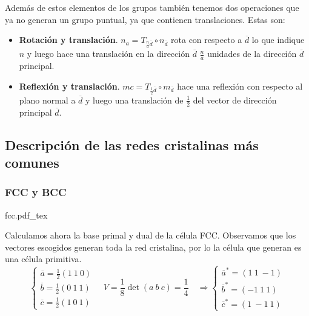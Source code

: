 \documentclass[leqno]{article}
\newcommand{\incfig}[1]{%
\center
\def\svgwidth{0.9\columnwidth}
{#1.pdf_tex}
}
\begin{document}
Además de estos elementos de los grupos también tenemos dos operaciones que ya no generan un grupo puntual, ya que contienen translaciones. Estas son:
\begin{itemize}[topsep=-6pt, itemsep=0pt]
  \item \textbf{Rotación y translación}. $n_a = T_{\frac{n}{a}\overline{d}}\circ n_{\overline{d}}$ rota con respecto a $\overline{d}$ lo que indique $n$  y luego hace una translación en la dirección  $\overline{d}$ $\frac{n}{a}$ unidades de la dirección $\overline{d}$ principal.
  \item  \textbf{Reflexión y translación}. $mc= T_{\frac{1}{2}\overline{d}}\circ m_{\overline{d}}$ hace una reflexión con respecto al plano normal a $\overline{d}$ y luego una translación de $\frac{1}{2}$ del vector de dirección principal $\overline{d}$.
\end{itemize}

\subsection{Descripción de las redes cristalinas más comunes}
\subsubsection{FCC y BCC}
\begin{minipage}{0.9\textwidth}
\incfig{fcc}
\end{minipage}

Calculamos ahora la base primal y dual de la célula FCC. Observamos que los vectores escogidos generan toda la red cristalina, por lo la célula que generan es una célula primitiva.
\[
\begin{cases}
  \overline{a} = \frac{1}{2} (1\ 1\ 0) \\
  \overline{b} = \frac{1}{2} (0\ 1\ 1) \\
  \overline{c} = \frac{1}{2} (1\ 0\ 1)
\end{cases} \quad 
V = \frac{1}{8}\det(a\ b\ c) = \frac{1}{4} \quad \Rightarrow
\begin{cases}
  \overline{a}^* = (1\ 1\ -1)\\
  \overline{b}^* = (-1\ 1\ 1 )\\
  \overline{c}^* = (1\ -1\ 1)
\end{cases} 
\] 
\end{document}
